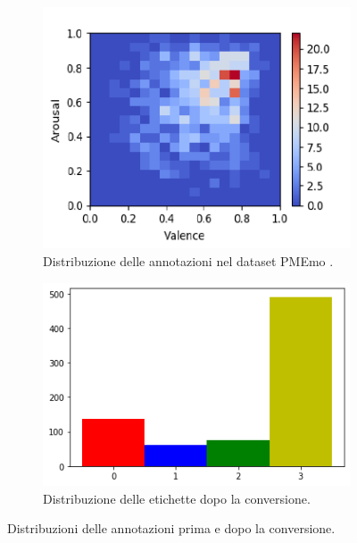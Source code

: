 \documentclass[11pt]{report}
\begin{document}
\begin{figure}
\centering
	\begin{subfigure}[t]{.45\textwidth}
	\centering
    \includegraphics[scale = 0.65]{img/PMEmo_distribution_annotations.PNG}
    \caption{Distribuzione delle annotazioni nel dataset PMEmo \cite{zhang2018pmemo}.}
	\end{subfigure}
	\quad
	\begin{subfigure}[t]{.45\textwidth}
	\centering
    \includegraphics[scale = 0.5]{img/PMEmo-class.png}
    \caption{Distribuzione delle etichette dopo la conversione.}
	\end{subfigure}
	\quad
\caption{Distribuzioni delle annotazioni prima e dopo la conversione.}
\label{fig-pmemo}
\end{figure}
\end{document}
